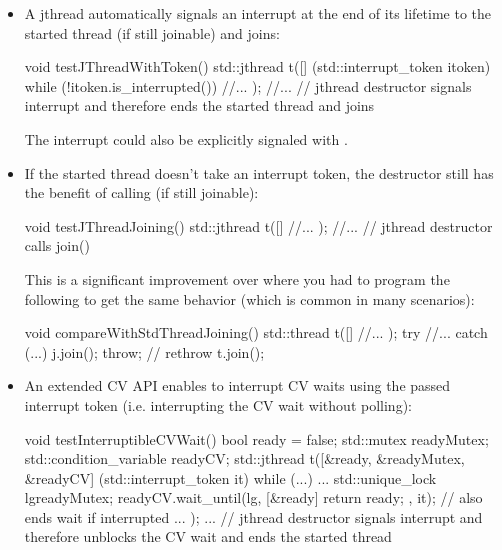 \begin{itemize}
 \item A jthread automatically signals an interrupt at the end of its lifetime to the started thread
        (if still joinable) and joins:
\begin{codeblock}
void testJThreadWithToken() 
{
    std::jthread t([] (std::interrupt_token itoken) {
                     while (!itoken.is_interrupted()) {
                       //...
                     }
                   });
    //...
} // jthread destructor signals interrupt and therefore ends the started thread and joins
\end{codeblock}

The interrupt could also be explicitly signaled with .

 \item If the started thread doesn't take an interrupt token, 
        the destructor still has the benefit of calling  (if still joinable):
\begin{codeblock}
void testJThreadJoining()
{
    std::jthread t([] {
                     //...
                   });
    //...
} // jthread destructor calls join()
\end{codeblock}
        This is a significant improvement over  where you had to program the following
        to get the same behavior (which is common in many scenarios):
\begin{codeblock}
void compareWithStdThreadJoining()
{
    std::thread t([] {
                    //...
                  });
    try {
      //...
    }
    catch (...) {
      j.join();
      throw;  // rethrow
    }
    t.join();
}
\end{codeblock}

 \item An extended CV API enables to interrupt CV waits using the passed interrupt token
        (i.e. interrupting the CV wait without polling):
\begin{codeblock}
void testInterruptibleCVWait() 
{
  bool ready = false;
  std::mutex readyMutex;
  std::condition_variable readyCV;
  std::jthread t([&ready, &readyMutex, &readyCV] (std::interrupt_token it) {
                    while (...) {
                      ...
                      {
                        std::unique_lock lg{readyMutex};
                        readyCV.wait_until(lg,
                                           [&ready] {
                                              return ready;
                                           },
                                           it);  // also ends wait if  interrupted
                      }
                      ...
                    }
                  });
  ...
} // jthread destructor signals interrupt and therefore unblocks the CV wait and ends the started thread
\end{codeblock}
\end{itemize}

